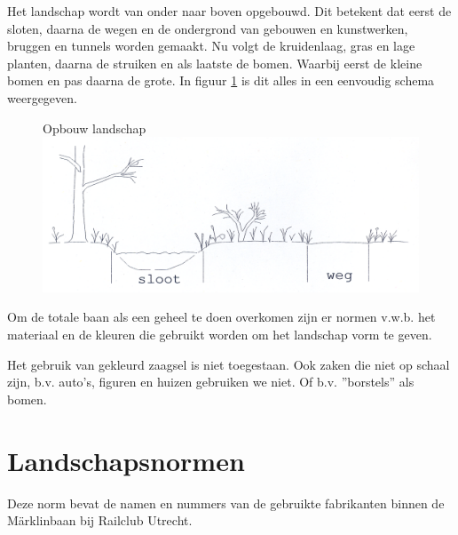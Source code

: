 \documentclass[12pt,a4paper]{report}
\begin{document}
Het landschap wordt van onder naar boven opgebouwd.
Dit betekent dat eerst de sloten, daarna de wegen en de ondergrond van gebouwen en kunstwerken, bruggen en tunnels worden gemaakt.
Nu volgt de kruidenlaag, gras en lage planten, daarna de struiken en als laatste de bomen.
Waarbij eerst de kleine bomen en pas daarna de grote.
In figuur \ref{figuur12} is dit alles in een eenvoudig schema weergegeven.

\begin{figure}[!ht]
  \captionbox
  {Opbouw landschap\label{figuur12}}
  {\includegraphics[scale=1.0]{images/rcu_figuur12}}
\end{figure}

Om de totale baan als een geheel te doen overkomen zijn er normen v.w.b. het materiaal en de kleuren die gebruikt worden om het landschap vorm te geven.

Het gebruik van gekleurd zaagsel is niet toegestaan. Ook zaken die niet op schaal zijn, b.v. auto's, figuren en huizen gebruiken we niet. Of b.v. ''borstels'' als bomen.

\section{Landschapsnormen}

Deze norm bevat de namen en nummers van de gebruikte fabrikanten binnen de M\"{a}rklinbaan bij Railclub Utrecht.
\end{document}
